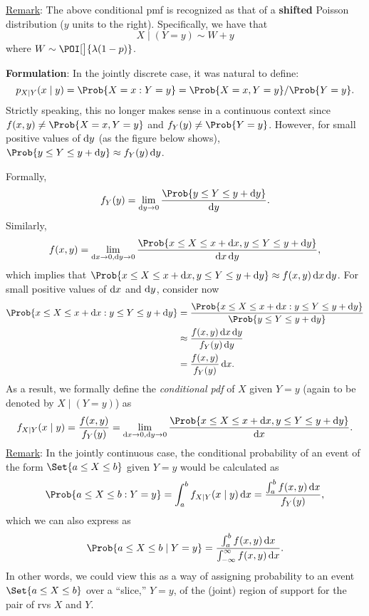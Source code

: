 \underline{Remark}: The above conditional pmf is recognized as that of a \textbf{shifted} Poisson distribution ($ y $ units to the right).
Specifically, we have that
\[ X\mid(Y=y)\sim W+y \]
where $ W \sim \POI[\big]{\lambda(1-p)} $.
\begin{Regular}{}
    \textbf{Formulation}: In the jointly discrete case, it was natural to define:
    \[ p_{X\mid Y}(x\mid y)=\Prob{X=x\given Y=y}=\Prob{X=x,Y=y}/\Prob{Y=y}. \]
    Strictly speaking, this no longer makes sense in a continuous context since $ f(x,y)\ne \Prob{X=x,Y=y} $ and
    $ f_Y(y)\ne \Prob{Y=y} $. However, for small positive values of $ \odif{y} $ (as the figure below shows),
    $ \Prob{y\le Y\le y+\odif{y}}\approx f_Y(y)\odif{y} $.
\end{Regular}
Formally,
\[ f_Y(y)=\lim\limits_{{\odif{y}} \to {0}}\frac{\Prob{y\le Y\le y+\odif{y}}}{\odif{y}}. \]
Similarly,
\[ f(x,y)=\lim\limits_{\odif{x}\to 0,\odif{y}\to 0}\frac{\Prob{x\le X\le x+\odif{x},y\le Y\le y+\odif{y}}}{\odif{x,y}},   \]
which implies that $ \Prob{x\le X\le x+\odif{x},y\le Y\le y+\odif{y}}\approx f(x,y)\odif{x,y} $. For small positive values of
$ \odif{x} $ and $ \odif{y} $, consider now
\begin{align*}
    \Prob{x\le X\le x+\odif{x}\given y\le Y\le y+\odif{y}}
     & =\frac{\Prob{x\le X\le x+\odif{x}\given y\le Y\le y+\odif{y}}}{\Prob{y\le Y\le y+\odif{y}}} \\
     & \approx \frac{f(x,y)\odif{x,y}}{f_Y(y)\odif{y}}                                             \\
     & =\frac{f(x,y)}{f_Y(y)} \odif{x}.
\end{align*}
As a result, we formally define the \emph{conditional pdf} of $ X $ given $ Y=y $ (again to be denoted by $ X\mid(Y=y) $) as
\[ f_{X\mid Y}(x\mid y)=\frac{f(x,y)}{f_Y(y)}=\lim\limits_{\odif{x}\to 0,\odif{y}\to 0}\frac{\Prob{x\le X\le x+\odif{x},y\le Y\le y+\odif{y}}}{\odif{x}}.  \]
\underline{Remark}: In the jointly continuous case, the conditional probability of an event of the form $ \Set{a\le X\le b} $ given $ Y=y $
would be calculated as
\[ \Prob{a\le X\le b\given Y=y}=\int_{a}^{b}f_{X\mid Y}(x\mid y)\odif{x}=\frac{\int_{a}^{b}f(x,y)\odif{x}}{f_Y(y)}, \]
which we can also express as
\[ \Prob{a\le X\le b\mid Y=y}=\frac{\int_{a}^{b}f(x,y)\odif{x}}{\int_{-\infty}^{\infty}f(x,y)\odif{x}}.  \]
In other words, we could view this as a way of assigning probability to an event
$ \Set{a\le X\le b} $ over a ``slice,'' $ Y=y $, of the (joint) region of support for the pair of rvs $ X $ and $ Y $.
